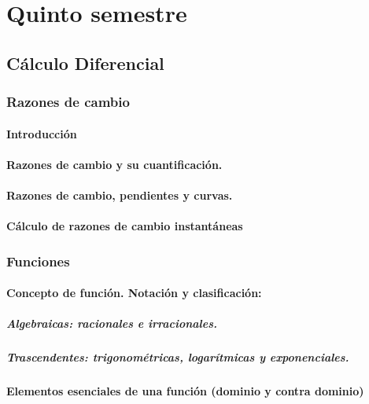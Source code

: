 \part{Quinto semestre}
\chapter{Cálculo Diferencial}



\section{Razones de cambio} %
\subsection{Introducción}
\subsection{Razones de cambio y su cuantificación.}
\subsection{Razones de cambio, pendientes y curvas.}
\subsection{Cálculo de razones de cambio instantáneas}



\section{Funciones} %
\subsection{Concepto de función. Notación y clasificación:}
\subsubsection{Algebraicas: racionales e irracionales.}
\subsubsection{Trascendentes: trigonométricas, logarítmicas y exponenciales.}
\subsection{Elementos esenciales de una función (dominio y contra dominio)}
